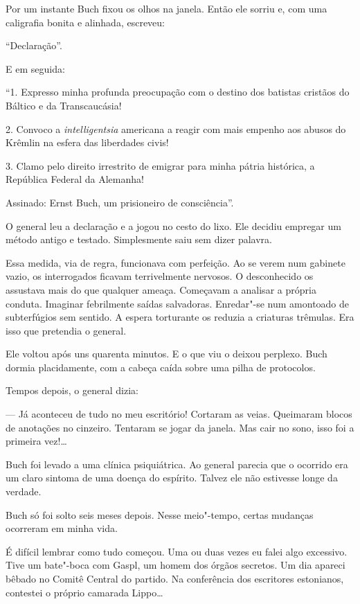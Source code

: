 Por um instante Buch fixou os olhos na janela. Então ele sorriu e, com
uma caligrafia bonita e alinhada, escreveu:

``Declaração''.

E em seguida:

``1. Expresso minha profunda preocupação com o destino dos batistas
cristãos do Báltico e da Transcaucásia!

2. Convoco a \emph{intelligentsia} americana a reagir com mais empenho
aos abusos do Krêmlin na esfera das liberdades civis!

3. Clamo pelo direito irrestrito de emigrar para minha pátria histórica,
a República Federal da Alemanha!

Assinado: Ernst Buch, um prisioneiro de consciência''.

O general leu a declaração e a jogou no cesto do lixo. Ele decidiu
empregar um método antigo e testado. Simplesmente saiu sem dizer
palavra.

Essa medida, via de regra, funcionava com perfeição. Ao se verem num
gabinete vazio, os interrogados ficavam terrivelmente nervosos. O
desconhecido os assustava mais do que qualquer ameaça. Começavam a
analisar a própria conduta. Imaginar febrilmente saídas salvadoras.
Enredar"-se num amontoado de subterfúgios sem sentido. A espera
torturante os reduzia a criaturas trêmulas. Era isso que pretendia o
general.

Ele voltou após uns quarenta minutos. E o que viu o deixou perplexo.
Buch dormia placidamente, com a cabeça caída sobre uma pilha de
protocolos.

Tempos depois, o general dizia:

--- Já aconteceu de tudo no meu escritório! Cortaram as veias. Queimaram
blocos de anotações no cinzeiro. Tentaram se jogar da janela. Mas cair
no sono, isso foi a primeira vez!\ldots{}

Buch foi levado a uma clínica psiquiátrica. Ao general parecia que o
ocorrido era um claro sintoma de uma doença do espírito. Talvez ele não
estivesse longe da verdade.

Buch só foi solto seis meses depois. Nesse meio"-tempo, certas mudanças
ocorreram em minha vida.

É difícil lembrar como tudo começou. Uma ou duas vezes eu falei algo
excessivo. Tive um bate"-boca com Gaspl, um homem dos órgãos secretos. Um
dia apareci bêbado no Comitê Central do partido. Na conferência dos
escritores estonianos, contestei o próprio camarada Lippo\ldots{}

